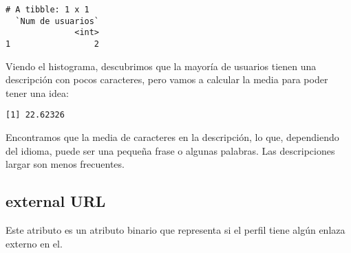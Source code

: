 \documentclass[
  letterpaper,
  DIV=11,
  numbers=noendperiod]{scrreprt}
\newenvironment{Shaded}{\begin{snugshade}}{\end{snugshade}}
\newcommand{\AttributeTok}[1]{\textcolor[rgb]{0.40,0.45,0.13}{#1}}
\newcommand{\DecValTok}[1]{\textcolor[rgb]{0.68,0.00,0.00}{#1}}
\newcommand{\FunctionTok}[1]{\textcolor[rgb]{0.28,0.35,0.67}{#1}}
\newcommand{\NormalTok}[1]{\textcolor[rgb]{0.00,0.23,0.31}{#1}}
\newcommand{\OtherTok}[1]{\textcolor[rgb]{0.00,0.23,0.31}{#1}}
\newcommand{\SpecialCharTok}[1]{\textcolor[rgb]{0.37,0.37,0.37}{#1}}
\newcommand{\StringTok}[1]{\textcolor[rgb]{0.13,0.47,0.30}{#1}}
\begin{document}
\begin{Shaded}
\end{Shaded}

\begin{verbatim}
# A tibble: 1 x 1
  `Num de usuarios`
              <int>
1                 2
\end{verbatim}

Viendo el histograma, descubrimos que la mayoría de usuarios tienen una
descripción con pocos caracteres, pero vamos a calcular la media para
poder tener una idea:

\begin{Shaded}
\end{Shaded}

\begin{verbatim}
[1] 22.62326
\end{verbatim}

Encontramos que la media de caracteres en la descripción, lo que,
dependiendo del idioma, puede ser una pequeña frase o algunas palabras.
Las descripciones largar son menos frecuentes.

\subsection{external URL}\label{external-url}

Este atributo es un atributo binario que representa si el perfil tiene
algún enlaza externo en el.

\begin{Shaded}
\end{Shaded}
\end{document}
